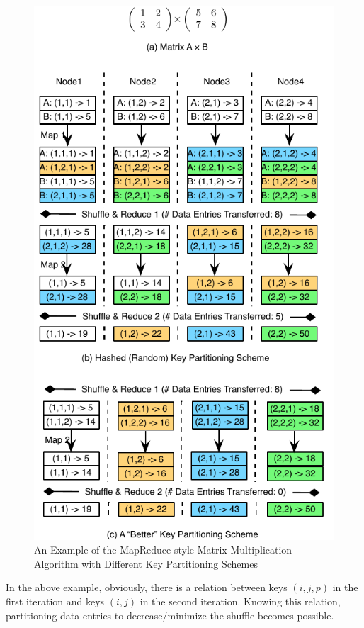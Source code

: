 \documentclass[10pt,journal,compsoc]{IEEEtran}
\begin{document}
\begin{figure}[!t]
\centering
\includegraphics[width=1\columnwidth]{figure1}
\caption{An Example of the MapReduce-style Matrix Multiplication Algorithm with Different Key Partitioning Schemes 
}
\label{fig:matrixExample}
\end{figure}



In the above example, obviously, there is a relation between
keys $(i,j,p)$ in the first iteration and  keys $(i,j)$ in the second iteration.
 Knowing this
relation, partitioning data entries to decrease/minimize the shuffle
becomes possible.
\end{document}
